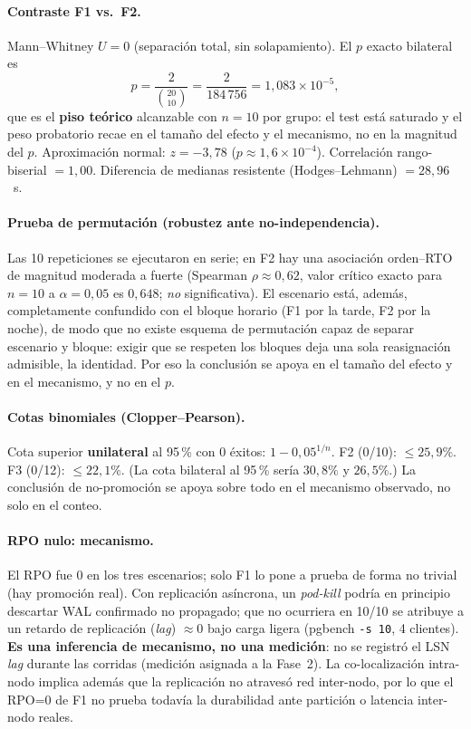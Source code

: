 \documentclass[11pt,letterpaper]{article}
\begin{document}
\paragraph{Contraste F1 vs.\ F2.} Mann--Whitney $U=0$ (separación total, sin solapamiento). El $p$ exacto bilateral es
\begin{equation*}
p=\frac{2}{\binom{20}{10}}=\frac{2}{184\,756}=1{,}083\times10^{-5},
\end{equation*}
que es el \textbf{piso teórico} alcanzable con $n=10$ por grupo: el test está saturado y el peso probatorio recae en el tamaño del efecto y el mecanismo, no en la magnitud del $p$. Aproximación normal: $z=-3{,}78$ ($p\approx1{,}6\times10^{-4}$). Correlación rango-biserial $=1{,}00$. Diferencia de medianas resistente (Hodges--Lehmann) $=28{,}96$~s.

\paragraph{Prueba de permutación (robustez ante no-independencia).} Las 10 repeticiones se ejecutaron en serie; en F2 hay una asociación orden--RTO de magnitud moderada a fuerte (Spearman $\rho\approx0{,}62$, valor crítico exacto para $n=10$ a $\alpha=0{,}05$ es $0{,}648$; \emph{no} significativa). El escenario está, además, completamente confundido con el bloque horario (F1 por la tarde, F2 por la noche), de modo que no existe esquema de permutación capaz de separar escenario y bloque: exigir que se respeten los bloques deja una sola reasignación admisible, la identidad. Por eso la conclusión se apoya en el tamaño del efecto y en el mecanismo, y no en el $p$.

\paragraph{Cotas binomiales (Clopper--Pearson).} Cota superior \textbf{unilateral} al 95\,\% con 0 éxitos: $1-0{,}05^{1/n}$. F2 (0/10): $\le 25{,}9\%$. F3 (0/12): $\le 22{,}1\%$. (La cota bilateral al 95\,\% sería $30{,}8\%$ y $26{,}5\%$.) La conclusión de no-promoción se apoya sobre todo en el mecanismo observado, no solo en el conteo.

\paragraph{RPO nulo: mecanismo.} El RPO fue 0 en los tres escenarios; solo F1 lo pone a prueba de forma no trivial (hay promoción real). Con replicación asíncrona, un \emph{pod-kill} podría en principio descartar WAL confirmado no propagado; que no ocurriera en 10/10 se atribuye a un retardo de replicación (\emph{lag}) $\approx 0$ bajo carga ligera (pgbench \texttt{-s 10}, 4 clientes). \textbf{Es una inferencia de mecanismo, no una medición}: no se registró el LSN \emph{lag} durante las corridas (medición asignada a la Fase~2). La co-localización intra-nodo implica además que la replicación no atravesó red inter-nodo, por lo que el RPO=0 de F1 no prueba todavía la durabilidad ante partición o latencia inter-nodo reales.
\end{document}
